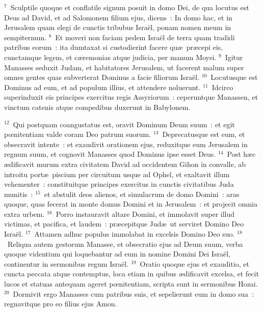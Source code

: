 ${}^{7}$~Sculptile quoque et conflatile signum posuit in domo Dei, de qua locutus est Deus ad David, et ad Salomonem filium ejus, dicens~: In domo hac, et in Jerusalem quam elegi de cunctis tribubus Isra\"el, ponam nomen meum in sempiternum.
${}^{8}$~Et moveri non faciam pedem Isra\"el de terra quam tradidi patribus eorum~: ita dumtaxat si custodierint facere qu\ae\ pr\ae cepi eis, cunctamque legem, et c\ae remonias atque judicia, per manum Moysi.
${}^{9}$~Igitur Manasses seduxit Judam, et habitatores Jerusalem, ut facerent malum super omnes gentes quas subverterat Dominus a facie filiorum Isra\"el.
${}^{10}$~Locutusque est Dominus ad eum, et ad populum illius, et attendere noluerunt.
${}^{11}$~Idcirco superinduxit eis principes exercitus regis Assyriorum~: ceperuntque Manassen, et vinctum catenis atque compedibus duxerunt in Babylonem.


${}^{12}$~Qui postquam coangustatus est, oravit Dominum Deum suum~: et egit pœnitentiam valde coram Deo patrum suorum.
${}^{13}$~Deprecatusque est eum, et obsecravit intente~: et exaudivit orationem ejus, reduxitque eum Jerusalem in regnum suum, et cognovit Manasses quod Dominus ipse esset Deus.
${}^{14}$~Post h\ae c \ae dificavit murum extra civitatem David ad occidentem Gihon in convalle, ab introitu port\ae\ piscium per circuitum usque ad Ophel, et exaltavit illum vehementer~: constituitque principes exercitus in cunctis civitatibus Juda munitis~:
${}^{15}$~et abstulit deos alienos, et simulacrum de domo Domini~: aras quoque, quas fecerat in monte domus Domini et in Jerusalem~: et projecit omnia extra urbem.
${}^{16}$~Porro instauravit altare Domini, et immolavit super illud victimas, et pacifica, et laudem~: pr\ae cepitque Jud\ae\ ut serviret Domino Deo Isra\"el.
${}^{17}$~Attamen adhuc populus immolabat in excelsis Domino Deo suo.
${}^{18}$~Reliqua autem gestorum Manasse, et obsecratio ejus ad Deum suum, verba quoque videntium qui loquebantur ad eum in nomine Domini Dei Isra\"el, continentur in sermonibus regum Isra\"el.
${}^{19}$~Oratio quoque ejus et exauditio, et cuncta peccata atque contemptus, loca etiam in quibus \ae dificavit excelsa, et fecit lucos et statuas antequam ageret pœnitentiam, scripta sunt in sermonibus Hozai.
${}^{20}$~Dormivit ergo Manasses cum patribus suis, et sepelierunt eum in domo sua~: regnavitque pro eo filius ejus Amon.


